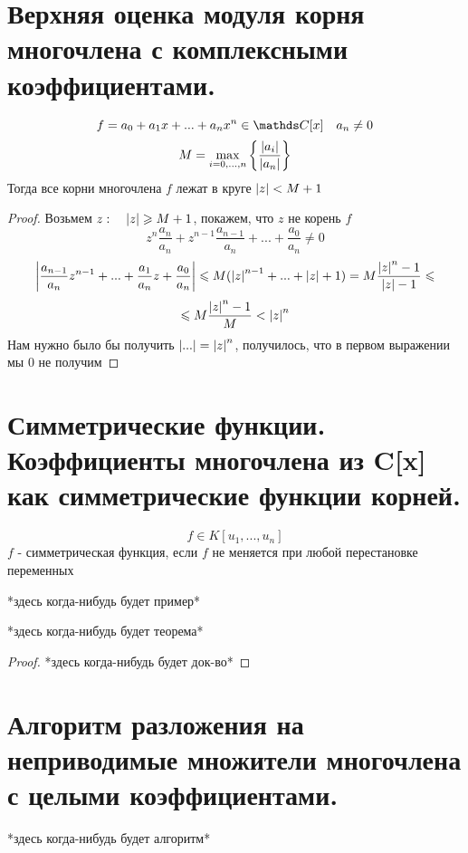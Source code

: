 \documentclass[algebra, 12pt, fleqn]{subfiles}
\begin{document}
\section{Верхняя оценка модуля корня многочлена с комплексными коэффициентами.}

  \begin{Theorem}
	\[f = a_0 + a_1 x + ... + a_n x^n \in \CC [x] \q a_n \neq 0\]
	\[M = \underset{i = 0, ..., n}{\max} \left\{\frac{\left|a_i\right|}{\left|a_n\right|}\right\}\]
	Тогда все корни многочлена $f$ лежат в круге $\left|z\right| < M + 1$
  \end{Theorem}

  \begin{proof}
      	Возьмем $z :  \quad \left|z\right| \geqslant M + 1$, покажем, что $z$  не корень $f$
		\[z^n \frac{a_n}{a_n} + z^{n - 1}  \frac{a_{n - 1} }{a_n} + ... + \frac{a_0}{a_n} \neq 0\]
		\[\left|\frac{a_{n - 1} }{a_n} z^{n - 1} + ... + \frac{a_1}{a_n} z  + \frac{a_0}{a_n}\right| \leqslant M(\left|z\right|^{n - 1} + ... + \left|z\right| + 1)
		= M \frac{\left|z\right|^n - 1}{\left|z\right| - 1} \leqslant\]
		\[\leqslant M \frac{\left|z\right|^n - 1}{M} < \left|z\right|^n\]
		Нам нужно было бы получить $\left|...\right| = \left|z\right|^n$, получилось, что в первом выражении мы 0 не получим
  \end{proof}
  \section{Симметрические функции. Коэффициенты многочлена из C[x] как симметрические функции корней.}

	\begin{Definition}
		\[f \in K[u_1, ..., u_n]\]
		$f$ - симметрическая функция, если $f$ не меняется при любой перестановке переменных
	\end{Definition}

	\begin{example}
		*здесь когда-нибудь будет пример*
	\end{example}

	\begin{theorem}[Виета]
		*здесь когда-нибудь будет теорема*
	\end{theorem}

	\begin{proof}
		*здесь когда-нибудь будет док-во*
	\end{proof}

  \section{Алгоритм разложения на неприводимые множители многочлена с целыми коэффициентами.}

	\begin{alg}
		*здесь когда-нибудь будет алгоритм*
	\end{alg}
\end{document}
